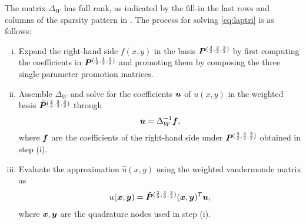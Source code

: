 The matrix $\Delta_W$ has full rank, as indicated by the fill-in the last rows and columns of the sparsity pattern in . The process for solving \eqref{eq:laptri} is as follows:
\begin{enumerate}[(i)]
	\item Expand the right-hand side $f(x,y)$ in the basis $\boldsymbol{P}^{(\frac{3}{2},\frac{3}{2},\frac{3}{2})}$ by first computing the coefficients in $\boldsymbol{P}^{(\frac{1}{2},\frac{1}{2},\frac{1}{2})}$ and promoting them by composing the three single-parameter promotion matrices. 
	\item Assemble $\Delta_W$ and solve for the coefficients $\boldsymbol{u}$ of $u(x,y)$ in the weighted basis $\tilde{\boldsymbol{P}}^{(\frac{3}{2},\frac{3}{2},\frac{3}{2})}$ through $$\boldsymbol{u} = \Delta_W^{-1}\boldsymbol{f},$$ where $\boldsymbol{f}$ are the coefficients of the right-hand side under $\boldsymbol{P}^{(\frac{3}{2},\frac{3}{2},\frac{3}{2})}$ obtained in step (i).
	\item Evaluate the approximation $\hat{u}(x,y)$ using the weighted vandermonde matrix as $$u(\boldsymbol{x},\boldsymbol{y}) = \tilde{\boldsymbol{P}}^{(\frac{3}{2},\frac{3}{2},\frac{3}{2})}(\boldsymbol{x},\boldsymbol{y})^T\boldsymbol{u},$$ where $\boldsymbol{x},\boldsymbol{y}$ are the quadrature nodes used in step (i).
\end{enumerate}


